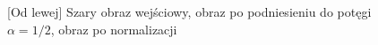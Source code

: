 \documentclass[a4paper,12pt, titlepage]{report}
\begin{document}
\begin{figure}[h]
    \centering
    \caption{[Od lewej] Szary obraz wejściowy, obraz po podniesieniu do potęgi \(\alpha=1/2\), obraz po normalizacji}%
    \label{fig:geo_after_grey1}%
\end{figure}
\FloatBarrier
\end{document}
